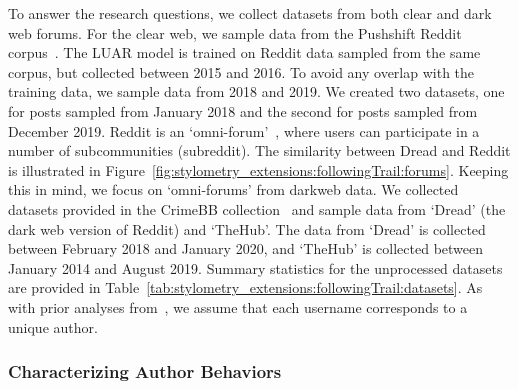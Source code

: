 To answer the research questions, we collect datasets from both clear and dark web forums.
For the clear web, we sample data from the Pushshift Reddit corpus~\citep{baumgartner2020pushshift}.
The LUAR model is trained on Reddit data sampled from the same corpus, but collected between 2015 and 2016.
To avoid any overlap with the training data, we sample data from 2018 and 2019.
We created two datasets, one for posts sampled from January 2018 and the second for posts sampled from December 2019.
Reddit is an `omni-forum'~\citep{munksgaard2016mixing}, where users can participate in a number of subcommunities (subreddit).
The similarity between Dread and Reddit is illustrated in Figure~\ref{fig:stylometry_extensions:followingTrail:forums}.
Keeping this in mind, we focus on `omni-forums' from darkweb data.
We collected datasets provided in the CrimeBB collection~\citep{pastrana2018crimebb} and sample data from `Dread' (the dark web version of Reddit) and `TheHub'.
The data from `Dread' is collected between February 2018 and January 2020, and `TheHub' is collected between January 2014 and August 2019.
Summary statistics for the unprocessed datasets are provided in Table~\ref{tab:stylometry_extensions:followingTrail:datasets}. 
As with prior analyses from~, we assume that each username corresponds to a unique author.

\subsubsection{Characterizing Author Behaviors}
\label{chp:stylometry_extensions:followingTrail:datasets:behaviors}

